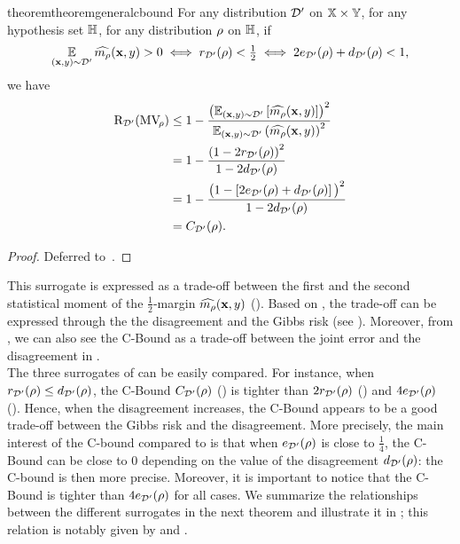 \begin{restatable}{theorem}{theoremgeneralcbound}\label{chap:pac-bayes:theorem:cbound}
For any distribution $\mathcal{D}'$ on $\mathbb{X}\times\mathbb{Y}$, for any hypothesis set $\mathbb{H}$, for any distribution $\rho$ on $\mathbb{H}$, if 
\begin{align*}
\operatorname*{\mathbb{E}}_{(\mathbf{x},y)\sim\mathcal{D}'}\widehat{m_{\rho}}(\mathbf{x},y) > 0 \iff r_{\mathcal{D}'}(\rho)<\tfrac{1}{2}\iff2e_{\mathcal{D}'}(\rho)+d_{\mathcal{D}'}(\rho)<1,
\end{align*}
we have
\begin{align}
\text{R}_{\mathcal{D}'}(\text{MV}_{\!\rho}) &\le 1-\frac{\left(\operatorname*{\mathbb{E}}_{(\mathbf{x},y)\sim\mathcal{D}'}\left[ \widehat{m_{\rho}}(\mathbf{x},y)\right]\right)^2}{\operatorname*{\mathbb{E}}_{(\mathbf{x},y)\sim\mathcal{D}'}\left( \widehat{m_{\rho}}(\mathbf{x},y)\right)^2}\label{chap:pac-bayes:eq:multi-class-cbound}\\
&= 1-\frac{\left(1-2r_{\mathcal{D}'}(\rho)\right)^2}{1-2d_{\mathcal{D}'}(\rho)}\label{chap:pac-bayes:eq:cbound-r-d}\\
    &= 1-\frac{\big(1-\left[2e_{\mathcal{D}'}(\rho)+d_{\mathcal{D}'}(\rho)\right]\big)^2}{1-2d_{\mathcal{D}'}(\rho)}\label{chap:pac-bayes:eq:cbound-e-d} \\ 
    &= {C}_{\mathcal{D}'}(\rho).\nonumber
\end{align}
\end{restatable}
\begin{noaddcontents}\begin{proof}
Deferred to~.
\end{proof}\end{noaddcontents}

This surrogate is expressed as a trade-off between the first and the second statistical moment of the $\frac{1}{2}$-margin $\widehat{m_{\rho}}(\mathbf{x},y)$ ().
Based on , the trade-off can be expressed through the the disagreement and the Gibbs risk (see ).
Moreover, from , we can also see the C-Bound as a trade-off between the joint error and the disagreement in .\\

The three surrogates of  can be easily compared.
For instance, when $r_{\mathcal{D}'}(\rho) \leq d_{\mathcal{D}'}(\rho)$, the C-Bound ${C}_{\mathcal{D}'}(\rho)$ () is tighter than $2r_{\mathcal{D}'}(\rho)$ () and $4e_{\mathcal{D}'}(\rho)$ ().
Hence, when the disagreement increases, the C-Bound appears to be a good trade-off between the Gibbs risk and the disagreement.
More precisely, the main interest of the C-bound compared to  is that when $e_{\mathcal{D}'}(\rho)$ is close to $\tfrac{1}{4}$, the C-Bound can be close to $0$ depending on the value of the disagreement $d_{\mathcal{D}'}(\rho)$: the C-bound is then more precise.
Moreover, it is important to notice that the C-Bound is tighter than $4e_{\mathcal{D}'}(\rho)$ for all cases.
We summarize the relationships between the different surrogates in the next theorem and illustrate it in ; this relation is notably given by \citet{GermainLacasseLavioletteMarchandRoy2015} and \citet{MasegosaLorenzenIgelSeldin2020}.

